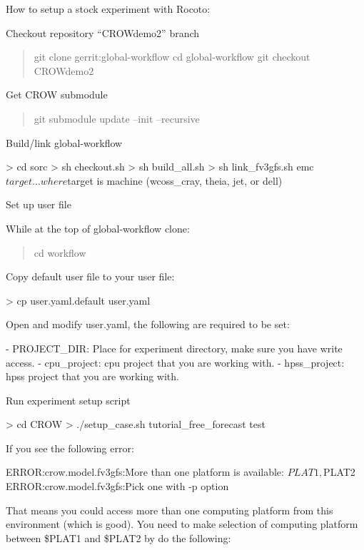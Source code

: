 How to setup a stock experiment with Rocoto\-:

Checkout repository “\-C\-R\-O\-Wdemo2” branch

\begin{quotation}
git clone gerrit\-:global-\/workflow cd global-\/workflow git checkout C\-R\-O\-Wdemo2

\end{quotation}


Get C\-R\-O\-W submodule

\begin{quotation}
git submodule update --init --recursive

\end{quotation}


Build/link global-\/workflow \begin{DoxyVerb}> cd sorc
> sh checkout.sh
> sh build_all.sh
> sh link_fv3gfs.sh emc $target
...where $target is machine (wcoss_cray, theia, jet, or dell)
\end{DoxyVerb}


Set up user file

While at the top of global-\/workflow clone\-: \begin{quotation}
cd workflow

\end{quotation}
Copy default user file to your user file\-: \begin{DoxyVerb}> cp user.yaml.default user.yaml
\end{DoxyVerb}
 Open and modify user.\-yaml, the following are required to be set\-: \begin{DoxyVerb}- PROJECT_DIR: Place for experiment directory, make sure you have write access.
- cpu_project: cpu project that you are working with.
- hpss_project: hpss project that you are working with.
\end{DoxyVerb}


Run experiment setup script \begin{DoxyVerb}> cd CROW
> ./setup_case.sh tutorial_free_forecast test
\end{DoxyVerb}


If you see the following error\-: \begin{DoxyVerb}ERROR:crow.model.fv3gfs:More than one platform is available: $PLAT1, $PLAT2
ERROR:crow.model.fv3gfs:Pick one with -p option
\end{DoxyVerb}


That means you could access more than one computing platform from this environment (which is good). You need to make selection of computing platform between \$\-P\-L\-A\-T1 and \$\-P\-L\-A\-T2 by do the following\-:

